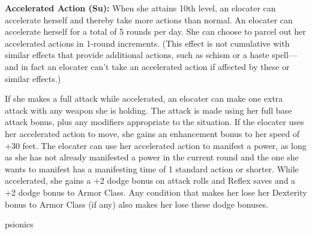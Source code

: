 {\textbf{Accelerated Action (Su):} When she attains 10th level, an elocater can accelerate herself and thereby take more actions than normal. An elocater can accelerate herself for a total of 5 rounds per day. She can choose to parcel out her accelerated actions in 1-round increments. (This effect is not cumulative with similar effects that provide additional actions, such as schism or a haste spell---and in fact an elocater can't take an accelerated action if affected by these or similar effects.)

If she makes a full attack while accelerated, an elocater can make one extra attack with any weapon she is holding. The attack is made using her full base attack bonus, plus any modifiers appropriate to the situation. If the elocater uses her accelerated action to move, she gains an enhancement bonus to her speed of +30 feet. The elocater can use her accelerated action to manifest a power, as long as she has not already manifested a power in the current round and the one she wants to manifest has a manifesting time of 1 standard action or shorter. While accelerated, she gains a +2 dodge bonus on attack rolls and Reflex saves and a +2 dodge bonus to Armor Class. Any condition that makes her lose her Dexterity bonus to Armor Class (if any) also makes her lose these dodge bonuses.
}
{}
{psionics}
{}
{}
{}